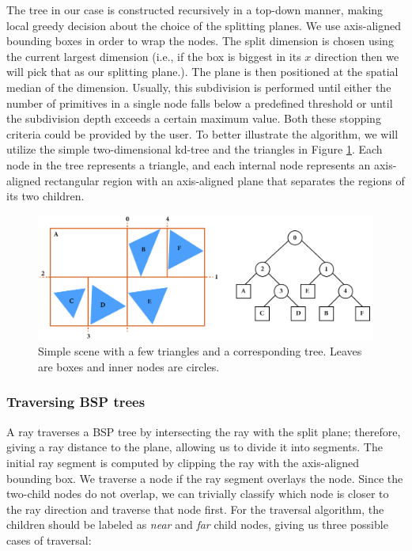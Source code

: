 \documentclass[a4paper,11pt,oneside]{article}
\begin{document}
The tree in our case is constructed recursively in a top-down manner, making local greedy decision about the choice of the splitting planes. We use axis-aligned bounding boxes in order to wrap the nodes. The split dimension is chosen using the current largest dimension (i.e., if the box is biggest in its $x$ direction then we will pick that as our splitting plane.). The plane is then positioned at the spatial median of the dimension. Usually, this subdivision is performed until either the number of primitives in a single node falls below a predefined threshold or until the subdivision depth exceeds a certain maximum value. Both these stopping criteria could be provided by the user. To better illustrate the algorithm, we will utilize the simple two-dimensional kd-tree and the triangles in Figure \ref{sec4.3:example-kd-tree}. Each node in the tree represents a triangle, and each internal node represents an axis-aligned rectangular region with an axis-aligned plane that separates the regions of its two children.

\begin{figure}[ht]
	\begin{center}
		\includegraphics[width=\textwidth]{section4/4.3/bsp-tree-example.png}
	\end{center}
	\caption{Simple scene with a few triangles and a corresponding tree. Leaves are boxes and inner nodes are circles.}
	\label{sec4.3:example-kd-tree}
\end{figure}

\subsubsection{Traversing BSP trees}

A ray traverses a BSP tree by intersecting the ray with the split plane; therefore, giving a ray distance to the plane, allowing us to divide it into segments. The initial ray segment is computed by clipping the ray with the axis-aligned bounding box. We traverse a node if the ray segment overlays the node. Since the two-child nodes do not overlap, we can trivially classify which node is closer to the ray direction and traverse that node first. For the traversal algorithm, the children should be labeled as \textit{near} and \textit{far} child nodes, giving us three possible cases of traversal:
\end{document}
